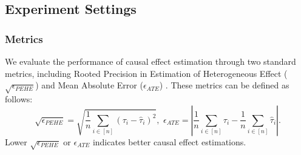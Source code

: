 
\subsection{Experiment Settings}
\subsubsection{Metrics}
We evaluate the performance of causal effect estimation through two standard metrics, including Rooted Precision in Estimation of Heterogeneous Effect ($\sqrt{\epsilon_{PEHE}}$) \cite{BART} and Mean Absolute Error ($\epsilon_{ATE}$) \cite{willmott2005advantages}. These metrics can be defined as follows:
\begin{equation}
    \sqrt{\epsilon_{PEHE}} = \sqrt{\frac{1}{n}\sum_{i\in[n]}(\tau_i-\hat{\tau}_i)^2}, \,\,\epsilon_{ATE} = |\frac{1}{n}\sum_{i\in [n]}{\tau_i}-\frac{1}{n}\sum_{i\in [n]}\hat{\tau}_i|.
\end{equation}
Lower $\sqrt{\epsilon_{PEHE}}$ or $\epsilon_{ATE}$ indicates better causal effect estimations.

